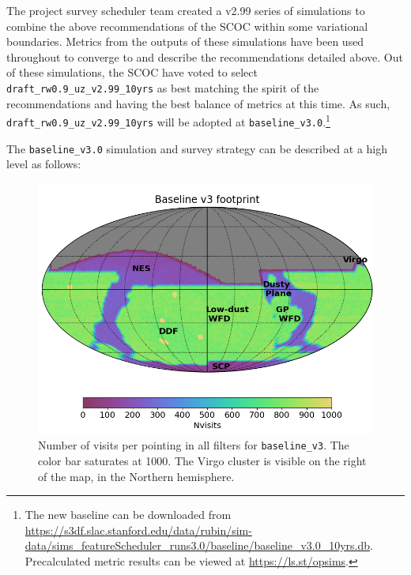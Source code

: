 The project survey scheduler team created a v2.99 series of simulations to combine the above recommendations of the SCOC within some variational boundaries. Metrics from the outputs of these simulations have been used throughout to converge to and describe the recommendations detailed above. Out of these simulations, the SCOC have voted to select \texttt{draft\_rw0.9\_uz\_v2.99\_10yrs} as best matching the spirit of the recommendations and having the best balance of metrics at this time. As such, \texttt{draft\_rw0.9\_uz\_v2.99\_10yrs} will be adopted at \texttt{baseline\_v3.0}.\footnote{The new baseline can be downloaded from \url{https://s3df.slac.stanford.edu/data/rubin/sim-data/sims_featureScheduler_runs3.0/baseline/baseline_v3.0_10yrs.db}. Precalculated metric results can be viewed at \url{https://ls.st/opsims}.} 



The \texttt{baseline\_v3.0} simulation and survey strategy can be described at a high level as follows:
\begin{figure}[h!]
    \centering
    \includegraphics[width=4.7in]{figures/v3footprint.png}
    \caption{Number of visits per pointing in all filters for \texttt{baseline\_v3}. The color bar saturates at 1000. The Virgo cluster is visible on the right of the map, in the Northern hemisphere.%
    }\label{fig:baselinev3Footprint}
\end{figure}



